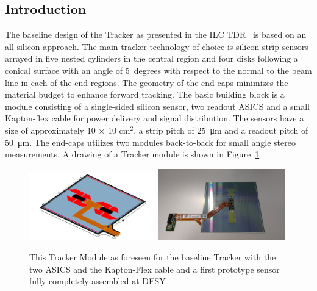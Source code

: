 \subsection{Introduction}
The baseline design of the \SID Tracker as presented in the ILC TDR~\cite{Behnke:2013lya} is based on an all-silicon approach.
The main tracker technology of choice is silicon strip sensors arrayed in five nested cylinders in the central
region and four disks following a conical surface with an angle of 5~degrees with respect to the normal to the 
beam line in each of the end regions. The geometry of the end-caps minimizes the material budget to enhance 
forward tracking. The basic building block is a module consisting of a single-sided silicon sensor, two \KPIX readout ASICS and a small Kapton-flex cable
for power delivery and signal distribution.
The sensors have a size of  approximately 10 $\times$ 10 cm$^2$, a strip pitch of \SI{25}{\micro\meter} and a readout pitch of \SI{50}{\micro\meter}.
The end-caps utilizes two modules back-to-back for small angle stereo measurements. 
A drawing of a Tracker module is shown in Figure~\ref{fig:SiliconTrackin:KPiX:module}
\begin{figure}
\includegraphics[width=0.49\textwidth]{Tracker/KPIX/Tracker_Module_SiD_Drawing.png}
\includegraphics[width=0.49\textwidth]{Tracker/KPIX/Tracker_Module_SiD_Photo.jpg}
\caption{This \SID Tracker Module as foreseen for the baseline \SID Tracker\cite{Behnke:2013lya} with the two \KPIX ASICS and the Kapton-Flex cable 
and a first prototype sensor fully completely assembled at DESY}
\label{fig:SiliconTrackin:KPiX:module}
\end{figure}

